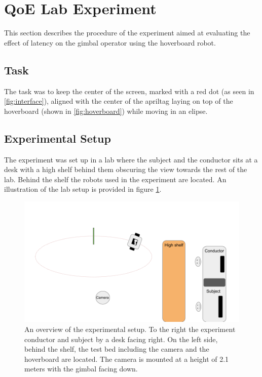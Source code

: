 \documentclass[nofilelist]{cslthse-msc}
\begin{document}
\section{QoE Lab Experiment}
This section describes the procedure of the experiment aimed at evaluating the effect of latency on the gimbal operator using the hoverboard robot. 

\subsection{Task}
The task was to keep the center of the screen, marked with a red dot (as seen in \ref{fig:interface}), aligned with the center of the apriltag laying on top of the hoverboard (shown in \ref{fig:hoverboard}) while moving in an elipse.

\subsection{Experimental Setup}
The experiment was set up in a lab where the subject and the conductor sits at a desk with a high shelf behind them obscuring the view towards the rest of the lab. Behind the shelf the robots used in the experiment are located. An illustration of the lab setup is provided in figure \ref{fig:exp-setup}. 

\begin{figure}[!hbt]
   \centering
   \includegraphics[scale=0.3]{images/exp-setup.png} 
   \caption{An overview of the experimental setup. To the right the experiment conductor and subject by a desk facing right. On the left side, behind the shelf, the test bed including the camera and the hoverboard are located. The camera is mounted at a height of 2.1 meters with the gimbal facing down.}
   \label{fig:exp-setup}
\end{figure}
\end{document}

